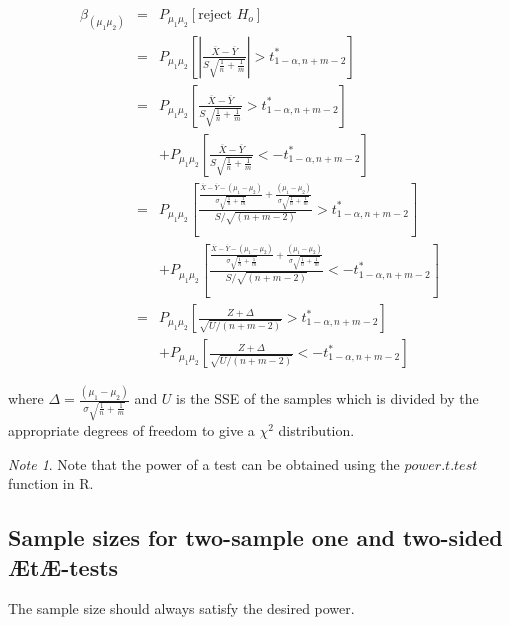 \documentclass[12pt,a4paper]{article}
\theoremstyle{regla}
\theoremstyle{remark}
\newtheorem{notes}{Note}[section]
\theoremstyle{definition}
\theoremstyle{nonumberbreak}
\begin{document}
\begin{eqnarray*}
\beta_{(\mu_1\mu_2)}& = & P_{\mu_1\mu_2}\left[\text{reject } H_o \right]\\
& = & P_{\mu_1\mu_2}\left[\left|\frac{\overline{X}-\overline{Y}}{S\sqrt{\frac{1}{n}+\frac{1}{m}}}\right| > t^\ast_{1-\alpha,n+m-2} \right]\\
& = & P_{\mu_1\mu_2}\left[\frac{\overline{X}-\overline{Y}}{S\sqrt{\frac{1}{n}+\frac{1}{m}}} > t^\ast_{1-\alpha,n+m-2} \right] \\
&& +  P_{\mu_1\mu_2} \left[\frac{\overline{X}-\overline{Y}}{S\sqrt{\frac{1}{n}+\frac{1}{m}}} <-t^\ast_{1-\alpha,n+m-2} \right] \\
& = &  P_{\mu_1\mu_2}\left[\frac{\frac{\overline{X}-\overline{Y}-(\mu_1-\mu_2)}{\sigma\sqrt{\frac{1}{n}+\frac{1}{m}}}+\frac{(\mu_1-\mu_2)}{\sigma\sqrt{\frac{1}{n}+\frac{1}{m}}}}{S/\sqrt{(n+m-2)}} > t^\ast_{1-\alpha,n+m-2}\right] \\
&& +   P_{\mu_1\mu_2}\left[\frac{\frac{\overline{X}-\overline{Y}-(\mu_1-\mu_2)}{\sigma\sqrt{\frac{1}{n}+\frac{1}{m}}}+\frac{(\mu_1-\mu_2)}{\sigma\sqrt{\frac{1}{n}+\frac{1}{m}}}}{S/\sqrt{(n+m-2)}} < -t^\ast_{1-\alpha,n+m-2}\right]
\\
& = &  P_{\mu_1\mu_2}\left[ \frac{Z + \Delta}{\sqrt{U/(n+m-2)}} > t^\ast_{1-\alpha,n+m-2} \right]\\
&& + P_{\mu_1\mu_2}\left[ \frac{Z + \Delta}{\sqrt{U/(n+m-2)}} < -t^\ast_{1-\alpha,n+m-2} \right]
\end{eqnarray*}

where $\Delta = \frac{(\mu_1-\mu_2)}{\sigma\sqrt{\frac{1}{n}+\frac{1}{m}}} $ and 
$U$ is the SSE of the samples which is divided by the appropriate degrees of freedom to give a $\chi^2$ distribution.

\begin{notes}
Note that the power of a test can be obtained using the $power.t.test$ function in R.
\end{notes}

\subsection{Sample sizes for two-sample one and two-sided ÆtÆ-tests}
\begin{fbox}
\begin{minipage}{0.97\textwidth}
The sample size should always satisfy the desired power. 



\end{minipage}
\end{fbox}
\end{document}
